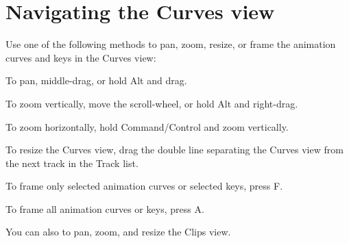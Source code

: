 \chapter{Navigating the Curves view}
\hypertarget{md__library_2_package_cache_2com_8unity_8timeline_0d1_87_86_2_documentation_0i_2crv__nav}{}\label{md__library_2_package_cache_2com_8unity_8timeline_0d1_87_86_2_documentation_0i_2crv__nav}
\label{md__library_2_package_cache_2com_8unity_8timeline_0d1_87_86_2_documentation_0i_2crv__nav_autotoc_md1141}%
%
 Use one of the following methods to pan, zoom, resize, or frame the animation curves and keys in the Curves view\+:


\begin{DoxyItemize}
\item To pan, middle-\/drag, or hold Alt and drag.
\item To zoom vertically, move the scroll-\/wheel, or hold Alt and right-\/drag.
\item To zoom horizontally, hold Command/\+Control and zoom vertically.
\item To resize the Curves view, drag the double line separating the Curves view from the next track in the Track list.
\item To frame only selected animation curves or selected keys, press F.
\item To frame all animation curves or keys, press A.
\end{DoxyItemize}

You can also  to pan, zoom, and resize the Clips view. 